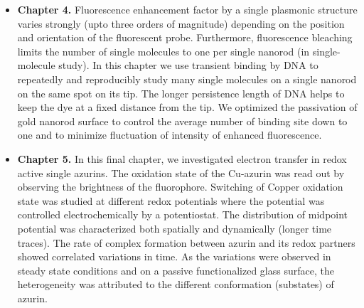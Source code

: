 \begin{itemize}
	\item \textbf{Chapter 4.} Fluorescence enhancement factor by a single plasmonic structure varies strongly  (upto three orders of magnitude) depending on the position and orientation of the fluorescent probe. Furthermore, fluorescence bleaching limits the number of single molecules to one per single nanorod (in single-molecule study). In this chapter we use transient binding by DNA to repeatedly and reproducibly study many single molecules on a single nanorod on the same spot on its tip. The longer persistence length of DNA helps to keep the dye at a fixed distance from the tip. We optimized the passivation of gold nanorod surface to control the average number of binding site down to one and to minimize fluctuation of intensity of enhanced fluorescence.

	\item \textbf{Chapter 5.} In this final chapter, we investigated electron transfer in redox active single azurins. The oxidation state of the Cu-azurin was read out by observing the brightness of the fluorophore. Switching of Copper oxidation state was studied at different redox potentials where the potential was controlled electrochemically by a potentiostat. The distribution of midpoint potential was characterized both spatially and dynamically (longer time traces). The rate of complex formation between azurin and its redox partners showed correlated variations in time. As the variations were observed in steady state conditions and on a passive functionalized glass surface, the heterogeneity was attributed to the different conformation (substates) of azurin.
\end{itemize}